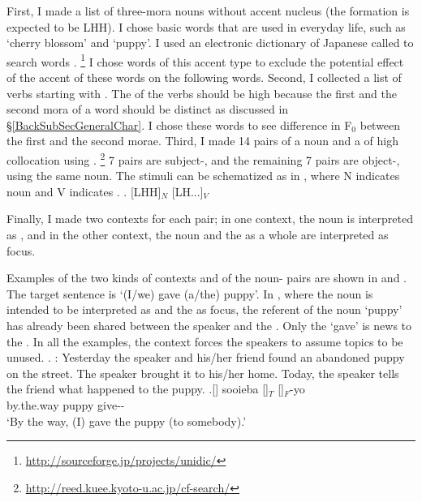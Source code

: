First, I made a list of three-mora nouns without accent nucleus (the  formation is expected to be LHH).
I chose basic words that are used in everyday life,
such as  `cherry blossom' and  `puppy'.
I used an electronic dictionary of Japanese called 
to search words
\cite{denetal02,denetal07}.%
	\footnote{\url{http://sourceforge.jp/projects/unidic/}}
I chose words of this accent type to
exclude the potential effect of the accent of these words on the following words.
Second, I collected a list of verbs starting with .
The  of the verbs should be high because the first and the second mora of a word should be distinct as discussed in \S \ref{BackSubSecGeneralChar}.
I chose these words to see difference in F$_{0}$ between the first
and the second morae.
Third, I made 14 pairs of a noun and a  of high collocation using  \cite{kawaharakurohashi06b,kawaharakurohashi06}.%
	\footnote{\url{http://reed.kuee.kyoto-u.ac.jp/cf-search/}}
7 pairs are subject-, and
the remaining 7 pairs are object-,
using the same noun.
The stimuli can be schematized as in \Next,
where N indicates noun and V indicates .
%
\ex. [LHH]$_{N}$ [LH...]$_{V}$

Finally, I made two contexts for each pair;
in one context, the noun is interpreted as ,
and in the other context, the noun and the  as a whole are interpreted as focus.

Examples of the two kinds of contexts and of the noun- pairs are shown in \Next and \NNext.
The target sentence is  `(I/we) gave (a/the) puppy'.
In \Next, where the noun is intended to be interpreted as  and the  as focus,
the referent of the noun  `puppy' has already been shared between the speaker and the .
Only the   `gave' is news to the .
In all the examples,
the context forces the speakers to assume topics to be unused.
%
\ex.\label{koinut}
: Yesterday the speaker and his/her friend found an abandoned puppy on the street. The speaker brought it to his/her home. Today, the speaker tells the friend what happened to the puppy.
\ag.[] sooieba []$_{T}$ []$_{F}$-yo \\
by.the.way puppy give-- \\
`By the way, (I) gave the puppy (to somebody).'

